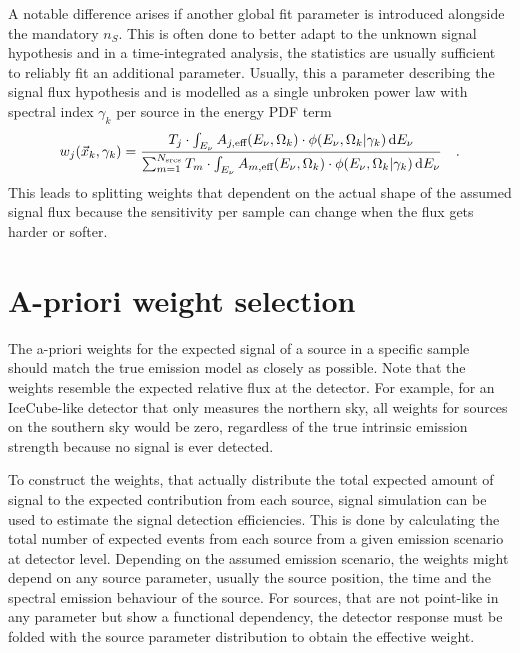 A notable difference arises if another global fit parameter is introduced alongside the mandatory $n_S$.
This is often done to better adapt to the unknown signal hypothesis and in a time-integrated analysis, the statistics are usually sufficient to reliably fit an additional parameter.
Usually, this a parameter describing the signal flux hypothesis and is modelled as a single unbroken power law with spectral index $\gamma_k$ per source in the energy PDF term
\begin{equation}
  w_j(\vec{x}_k, \gamma_k)
  = \frac
      {
        T_j \cdot \int_{E_\nu} A_{j,\text{eff}}(E_\nu,\Omega_k)\cdot
        \phi(E_\nu, \Omega_k | \gamma_k)\,\mathrm{d}E_\nu
      }
      {
        \sum_{m=1}^{N_\text{srcs}}
        T_m \cdot \int_{E_\nu} A_{m,\text{eff}}(E_\nu,\Omega_k)\cdot
        \phi(E_\nu, \Omega_k | \gamma_k)\,\mathrm{d}E_\nu
      }
  \quad\text{.}
\end{equation}
This leads to splitting weights that dependent on the actual shape of the assumed signal flux because the sensitivity per sample can change when the flux gets harder or softer.


\section{A-priori weight selection}
The a-priori weights for the expected signal of a source in a specific sample should match the true emission model as closely as possible.
Note that the weights resemble the expected relative flux at the detector.
For example, for an IceCube-like detector that only measures the northern sky, all weights for sources on the southern sky would be zero, regardless of the true intrinsic emission strength because no signal is ever detected.

To construct the weights, that actually distribute the total expected amount of signal to the expected contribution from each source, signal simulation can be used to estimate the signal detection efficiencies.
This is done by calculating the total number of expected events from each source from a given emission scenario at detector level.
Depending on the assumed emission scenario, the weights might depend on any source parameter, usually the source position, the time and the spectral emission behaviour of the source.
For sources, that are not point-like in any parameter but show a functional dependency, the detector response must be folded with the source parameter distribution to obtain the effective weight.

